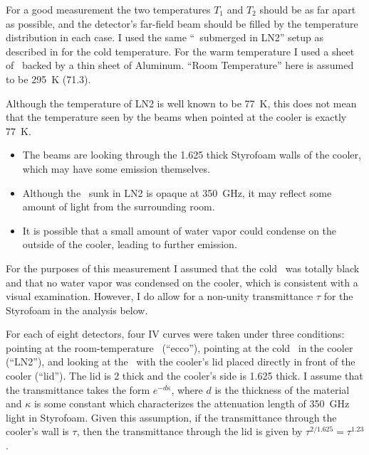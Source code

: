 For a good measurement the two temperatures $T_1$ and $T_2$ should be as far apart as possible, and the detector's far-field beam should be filled by the temperature distribution in each case.
I used the same ``\ecco\ submerged in LN2'' setup as described in  for the cold temperature.
For the warm temperature I used a sheet of \ecco\ backed by a thin sheet of Aluminum.
``Room Temperature'' here is assumed to be \SI{295}{\kelvin} (\SI{71.3}{\fahrenheit}).

Although the temperature of LN2 is well known to be \SI{77}{\kelvin}, this does not mean that the temperature seen by the beams when pointed at the cooler is exactly \SI{77}{\kelvin}.
\begin{itemize}
  \item The beams are looking through the \SI{1.625}{\in} thick Styrofoam walls of the cooler, which may have some emission themselves.
  \item Although the \ecco\ sunk in LN2 is opaque at \SI{350}{\GHz}, it may reflect some amount of light from the surrounding room.
  \item It is possible that a small amount of water vapor could condense on the outside of the cooler, leading to further emission.
\end{itemize}
For the purposes of this measurement I assumed that the cold \ecco\ was totally black and that no water vapor was condensed on the cooler, which is consistent with a visual examination.
However, I do allow for a non-unity transmittance $\tau$ for the Styrofoam in the analysis below.

For each of eight detectors, four IV curves were taken under three conditions: pointing at the room-temperature \ecco\ (``ecco''), pointing at the cold \ecco\ in the cooler (``LN2''), and looking at the \ecco\ with the cooler's lid placed directly in front of the cooler (``lid'').
The lid is \SI{2}{\in} thick and the cooler's side is \SI{1.625}{\in} thick.
I assume that the transmittance takes the form $e^{-d \kappa}$, where $d$ is the thickness of the material and $\kappa$ is some constant which characterizes the attenuation length of \SI{350}{\GHz} light in Styrofoam.
Given this assumption, if the transmittance through the cooler's wall is $\tau$, then the transmittance through the lid is given by $\tau^{2/1.625} = \tau^{1.23}$.

